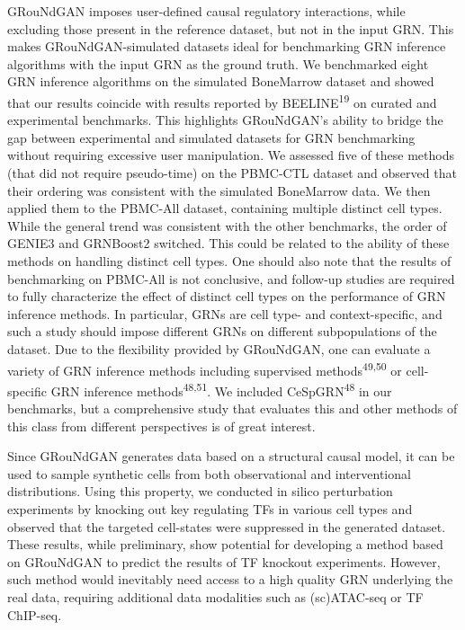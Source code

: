 GRouNdGAN imposes user-defined causal regulatory interactions, while excluding those present in the reference dataset, but not in the input GRN. This makes GRouNdGAN-simulated datasets ideal for benchmarking GRN inference algorithms with the input GRN as the ground truth. We benchmarked eight GRN inference algorithms on the simulated BoneMarrow dataset and showed that our results coincide with results reported by BEELINE\textsuperscript{19} on curated and experimental benchmarks. This highlights GRouNdGAN’s ability to bridge the gap between experimental and simulated datasets for GRN benchmarking without requiring excessive user manipulation. We assessed five of these methods (that did not require pseudo-time) on the PBMC-CTL dataset and observed that their ordering was consistent with the simulated BoneMarrow data. We then applied them to the PBMC-All dataset, containing multiple distinct cell types. While the general trend was consistent with the other benchmarks, the order of GENIE3 and GRNBoost2 switched. This could be related to the ability of these methods on handling distinct cell types. One should also note that the results of benchmarking on PBMC-All is not conclusive, and follow-up studies are required to fully characterize the effect of distinct cell types on the performance of GRN inference methods. In particular, GRNs are cell type- and context-specific, and such a study should impose different GRNs on different subpopulations of the dataset. Due to the flexibility provided by GRouNdGAN, one can evaluate a variety of GRN inference methods including supervised methods\textsuperscript{49,50} or cell-specific GRN inference methods\textsuperscript{48,51}. We included CeSpGRN\textsuperscript{48} in our benchmarks, but a comprehensive study that evaluates this and other methods of this class from different perspectives is of great interest.

Since GRouNdGAN generates data based on a structural causal model, it can be used to sample synthetic cells from both observational and interventional distributions. Using this property, we conducted in silico perturbation experiments by knocking out key regulating TFs in various cell types and observed that the targeted cell-states were suppressed in the generated dataset. These results, while preliminary, show potential for developing a method based on GRouNdGAN to predict the results of TF knockout experiments. However, such method would inevitably need access to a high quality GRN underlying the real data, requiring additional data modalities such as (sc)ATAC-seq or TF ChIP-seq.

